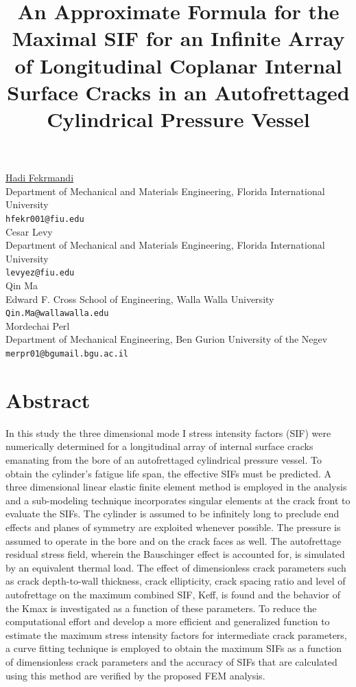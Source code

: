 \documentclass[article, A4, 11pt]{llncs}%
\begin{document}
\title{An Approximate Formula for the Maximal SIF for an Infinite Array of Longitudinal Coplanar Internal Surface Cracks in an Autofrettaged Cylindrical Pressure Vessel}
 \author{} \institute{}
\maketitle
\begin{center}
{\large \underline{Hadi  Fekrmandi}}\\
Department of Mechanical and Materials Engineering, Florida International University\\
{\tt hfekr001@fiu.edu}
\\ \vspace{4mm}
{\large Cesar  Levy}\\
Department of Mechanical and Materials Engineering, Florida International University\\
{\tt levyez@fiu.edu}
\\ \vspace{4mm}
{\large Qin Ma}\\
Edward F. Cross School of Engineering, Walla Walla University\\
{\tt Qin.Ma@wallawalla.edu}
\\ \vspace{4mm}
{\large Mordechai Perl}\\
Department of Mechanical Engineering, Ben Gurion University of the Negev\\
{\tt merpr01@bgumail.bgu.ac.il}
\end{center}

\section*{Abstract}
In this study the three dimensional mode I stress intensity factors (SIF) were numerically determined for a longitudinal array of internal surface cracks emanating from the bore of an autofrettaged cylindrical pressure vessel. To obtain the cylinder’s fatigue life span, the effective SIFs must be predicted. A three dimensional linear elastic finite element method is employed in the analysis and a sub-modeling technique incorporates singular elements at the crack front to evaluate the SIFs. The cylinder is assumed to be infinitely long to preclude end effects and planes of symmetry are exploited whenever possible. The pressure is assumed to operate in the bore and on the crack faces as well. The autofrettage residual stress field, wherein the Bauschinger effect is accounted for, is simulated by an equivalent thermal load. The effect of dimensionless crack parameters such as crack depth-to-wall thickness, crack ellipticity, crack spacing ratio and level of autofrettage on the maximum combined SIF, Keff, is found and the behavior of the Kmax is investigated as a function of these parameters. To reduce the computational effort and develop a more efficient and generalized function to estimate the maximum stress intensity factors for intermediate crack parameters, a curve fitting technique is employed to obtain the maximum SIFs as a function of dimensionless crack parameters and the accuracy of SIFs that are calculated using this method are verified by the proposed FEM analysis. 
\end{document}
